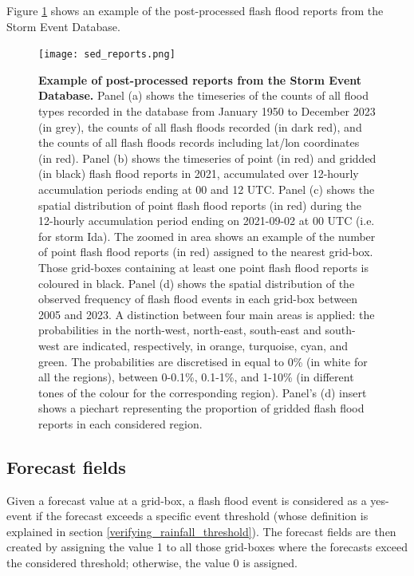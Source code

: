 Figure \ref{fig:sed_reports} shows an example of the post-processed flash flood reports from the Storm Event Database.

\begin{figure}[htbp]
\centering
\texttt{[image: sed\_reports.png]}
\caption{\textbf{Example of post-processed reports from the Storm Event Database.} Panel (a) shows the timeseries of the counts of all flood types recorded in the database from January 1950 to December 2023 (in grey), the counts of all flash floods recorded (in dark red), and the counts of all flash floods records including lat/lon coordinates (in red). Panel (b) shows the timeseries of point (in red) and gridded (in black) flash flood reports in 2021, accumulated over 12-hourly accumulation periods ending at 00 and 12 UTC. Panel (c) shows the spatial distribution of point flash flood reports (in red) during the 12-hourly accumulation period ending on 2021-09-02 at 00 UTC (i.e. for storm Ida). The zoomed in area shows an example of the number of point flash flood reports (in red) assigned to the nearest grid-box. Those grid-boxes containing at least one point flash flood reports is coloured in black. Panel (d) shows the spatial distribution of the observed frequency of flash flood events in each grid-box between 2005 and 2023. A distinction between four main areas is applied: the probabilities in the north-west, north-east, south-east and south-west are indicated, respectively, in orange, turquoise, cyan, and green. The probabilities are discretised in equal to 0\% (in white for all the regions), between 0-0.1\%, 0.1-1\%, and 1-10\% (in different tones of the colour for the corresponding region). Panel’s (d) insert shows a piechart representing the proportion of gridded flash flood reports in each considered region.}
\label{fig:sed_reports}
\end{figure}


\subsection{Forecast fields}

Given a forecast value at a grid-box, a flash flood event is considered as a yes-event if the forecast exceeds a specific event threshold (whose definition is explained in section \ref{verifying_rainfall_threshold}). The forecast fields are then created by assigning the value 1 to all those grid-boxes where the forecasts exceed the considered threshold; otherwise, the value 0 is assigned. 

